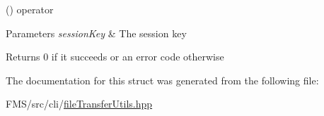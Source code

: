 () operator 


\begin{DoxyParams}{Parameters}
{\em sessionKey} & The session key \\
\hline
\end{DoxyParams}
\begin{DoxyReturn}{Returns}
0 if it succeeds or an error code otherwise 
\end{DoxyReturn}


The documentation for this struct was generated from the following file:\begin{DoxyCompactItemize}
\item 
FMS/src/cli/\hyperlink{fileTransferUtils_8hpp}{fileTransferUtils.hpp}\end{DoxyCompactItemize}
